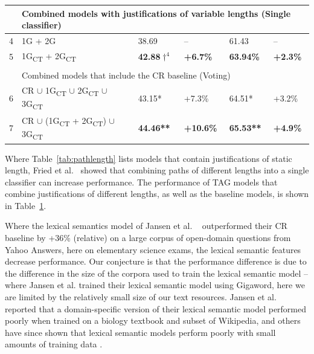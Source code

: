 {\begin{table}[t]
\begin{center}
\begin{tabular}{p{0.3mm}p{55mm}llll}
\\
\hline
& \multicolumn{5}{l}{Combined models with justifications of variable lengths (Single classifier)}\\
\hline
4 & 1G + 2G										& 38.69			& --		& 61.43  	& --  \\
5 & 1G\textsubscript{CT} + 2G\textsubscript{CT} 	& {\bf 42.88$\dagger ^4$}	& {\bf +6.7\%}		& {\bf 63.94\%}  	& {\bf +2.3\%}	  \\

\\
\hline
& \multicolumn{5}{l}{Combined models that include the CR baseline (Voting)}\\
\hline
6 & CR $\cup$ 1G\textsubscript{CT} $\cup$ 2G\textsubscript{CT} $\cup$ 3G\textsubscript{CT} 			& 43.15*			& +7.3\%			& 64.51*		& +3.2\%	  \\
7 & CR $\cup$ (1G\textsubscript{CT} + 2G\textsubscript{CT}) $\cup$ 3G\textsubscript{CT} 			& {\bf 44.46**}		& {\bf +10.6\%}		& {\bf 65.53**} 		& {\bf +4.9\%}	  \\

\hline
\end{tabular}
\vspace{-6mm}
\label{tab:combinedmodels}
\end{center}
\end{table}

Where Table~\ref{tab:pathlength} lists models that contain justifications of static length, Fried et al.~ showed that combining paths of different lengths into a single classifier can increase performance.  The performance of TAG models that combine justifications of different lengths, as well as the baseline models, is shown in Table~\ref{tab:combinedmodels}.

{} Where the lexical semantics model of Jansen et al. ~ outperformed their CR baseline by +36\% (relative) on a large corpus of open-domain questions from Yahoo Answers, here on elementary science exams, the lexical semantic features decrease performance.  Our conjecture is that the performance difference is due to the difference in the size of the corpora used to train the lexical semantic model -- where Jansen et al. trained their lexical semantic model using Gigaword, here we are limited by the relatively small size of our text resources.  Jansen et al. ~ reported that a domain-specific version of their lexical semantic model performed poorly when trained on a biology textbook and subset of Wikipedia, and others have since shown that lexical semantic models perform poorly with small amounts of training data \cite{sharp-EtAl:2015:NAACL-HLT}. 

}
